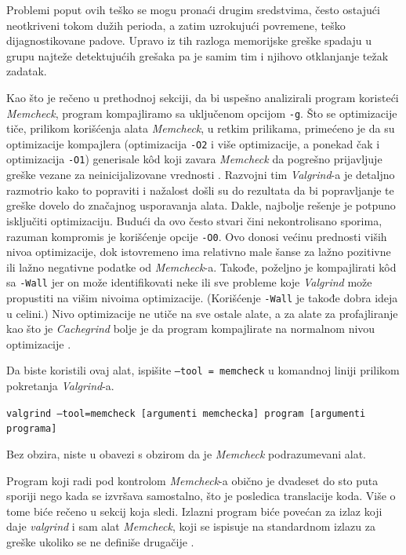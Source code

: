 \documentclass[12pt,oneside]{memoir}
\theoremstyle{plain}
\theoremstyle{definition}
\begin{document}
Problemi poput ovih teško se mogu pronaći drugim sredstvima, često ostajući neotkriveni tokom dužih perioda, a zatim uzrokujući povremene, teško dijagnostikovane padove. Upravo iz tih razloga memorijske greške spadaju u grupu najteže detektujućih grešaka pa je samim tim i njihovo otklanjanje težak zadatak.

Kao što je rečeno u prethodnoj sekciji, da bi uspešno analizirali program koristeći \textit{Memcheck}, program kompajliramo sa uključenom opcijom \texttt{-g}. Što se optimizacije tiče, prilikom korišćenja alata \textit{Memcheck}, u retkim prilikama, primećeno je da su optimizacije kompajlera (optimizacija \texttt{-O2} i više optimizacije, a ponekad čak i optimizacija \texttt{-O1}) generisale k\^od koji zavara \textit{Memcheck} da pogrešno prijavljuje greške vezane za neinicijalizovane vrednosti \cite{ValgrindCore}. Razvojni tim \textit{Valgrind}-a je detaljno razmotrio kako to popraviti i nažalost došli su do rezultata da bi popravljanje te greške dovelo do značajnog usporavanja alata. Dakle, najbolje rešenje je potpuno isključiti optimizaciju. Budući da ovo često stvari čini nekontrolisano sporima, razuman kompromis je korišćenje opcije \texttt{-O0}. Ovo donosi većinu prednosti viših nivoa optimizacije, dok istovremeno ima relativno male šanse za lažno pozitivne ili lažno negativne podatke od \textit{Memcheck}-a. Takođe, poželjno je kompajlirati k\^od sa \texttt{-Wall} jer on može identifikovati neke ili sve probleme koje \textit{Valgrind} može propustiti na višim nivoima optimizacije. (Korišćenje \texttt{-Wall} je takođe dobra ideja u celini.) Nivo optimizacije ne utiče na sve ostale alate, a za alate za profajliranje kao što je \textit{Cachegrind} bolje je da program kompajlirate na normalnom nivou optimizacije \cite{ValgrindCore}. 

Da biste koristili ovaj alat, ispišite \texttt{--tool = memcheck} u komandnoj liniji prilikom pokretanja \textit{Valgrind}-a.
 \begin{center}
\texttt{valgrind –tool=memcheck [argumenti memchecka] program [argumenti programa]}
\end{center}
Bez obzira, niste u obavezi s obzirom da je \textit{Memcheck} podrazumevani alat.

Program koji radi pod kontrolom \textit{Memcheck}-a obično je dvadeset do sto puta sporiji nego kada se izvršava samostalno, što je posledica translacije koda. Više o tome biće rečeno u sekcij koja sledi. Izlazni program biće povećan za izlaz koji daje \textit{valgrind} i sam alat \textit{Memcheck}, koji se ispisuje na standardnom izlazu za greške ukoliko se ne definiše drugačije \cite{Memcheck}. 
\end{document}
